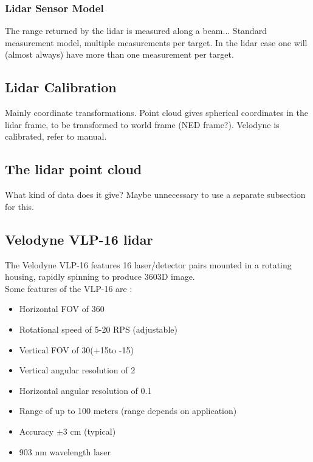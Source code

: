 \subsubsection{Lidar Sensor Model}
The range returned by the lidar is measured along a beam... 
Standard measurement model, multiple measurements per target. In the lidar case one will (almost always) have more than one measurement per target.
\subsection{Lidar Calibration}
Mainly coordinate transformations. Point cloud gives spherical coordinates in the lidar frame, to be transformed to world frame (NED frame?). Velodyne is calibrated, refer to manual.
\subsection{The lidar point cloud}
What kind of data does it give? Maybe unnecessary to use a separate subsection for this.
\subsection{Velodyne VLP-16 lidar}
The Velodyne VLP-16 features 16 laser/detector pairs mounted in a rotating housing, rapidly spinning to produce 360\degree 3D image.\smallskip \\
Some features of the VLP-16 are :
\begin{itemize}
    \item Horizontal FOV of 360\degree
    \item Rotational speed of 5-20 RPS (adjustable)
    \item Vertical FOV of 30\degree (+15\degree to -15\degree)
    \item Vertical angular resolution of 2\degree
    \item Horizontal angular resolution of 0.1\degree
    \item Range of up to 100 meters (range depends on application)
    \item Accuracy $\pm3$ cm (typical)
    \item 903 nm wavelength laser
\end{itemize}

\cleardoublepage